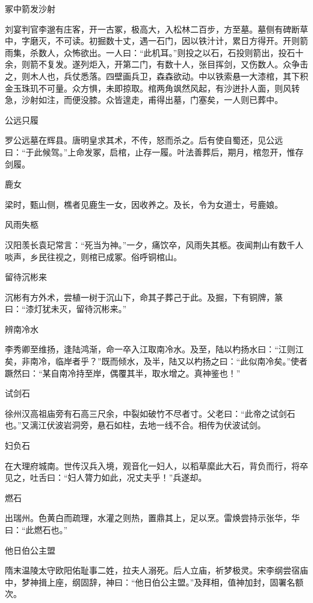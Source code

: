 \documentclass[a4paper,12pt,UTF8,twoside]{ctexbook}
\begin{document}
    冢中箭发沙射
    
    刘宴判官李邈有庄客，开一古冢，极高大，入松林二百步，方至墓。墓侧有碑断草中，字磨灭，不可读。初掘数十丈，遇一石门，因以铁汁计，累日方得开。开则箭雨集，杀数人，众怖欲出。一人曰：“此机耳。”则投之以石，石投则箭出，投石十余，则箭不复发。遂列炬入，开第二门，有数十人，张目挥剑，又伤数人。众争击之，则木人也，兵仗悉落。四壁画兵卫，森森欲动。中以铁索悬一大漆棺，其下积金玉珠玑不可量。众方惧，未即掠取。棺两角飒然风起，有沙迸扑人面，则风转急，沙射如注，而便没膝。众皆遑走，甫得出墓，门塞矣，一人则已葬中。
    
    公远只履
    
    罗公远墓在辉县。唐明皇求其术，不传，怒而杀之。后有使自蜀还，见公远曰：“于此候驾。”上命发冢，启棺，止存一履。叶法善葬后，期月，棺忽开，惟存剑履。
    
    鹿女
    
    梁时，甄山侧，樵者见鹿生一女，因收养之。及长，令为女道士，号鹿娘。
    
    风雨失柩
    
    汉阳羡长袁玘常言：“死当为神。”一夕，痛饮卒，风雨失其柩。夜闻荆山有数千人啖声，乡民往视之，则棺已成冢。俗呼铜棺山。
    
    留待沉彬来
    
    沉彬有方外术，尝植一树于沉山下，命其子葬己于此。及掘，下有铜牌，篆曰：“漆灯犹未灭，留待沉彬来。”
    
    辨南冷水
    
    李秀卿至维扬，逢陆鸿渐，命一卒入江取南冷水。及至，陆以杓扬水曰：“江则江矣，非南冷，临岸者乎？”既而倾水，及半，陆又以杓扬之曰：“此似南冷矣。”使者蹶然曰：“某自南冷持至岸，偶覆其半，取水增之。真神鉴也！”
    
    试剑石
    
    徐州汉高祖庙旁有石高三尺余，中裂如破竹不尽者寸。父老曰：“此帝之试剑石也。”又漓江伏波岩洞旁，悬石如柱，去地一线不合。相传为伏波试剑。
    
    妇负石
    
    在大理府城南。世传汉兵入境，观音化一妇人，以稻草縻此大石，背负而行，将卒见之，吐舌曰：“妇人膂力如此，况丈夫乎！”兵遂却。
    
    燃石
    
    出瑞州。色黄白而疏理，水灌之则热，置鼎其上，足以烹。雷焕尝持示张华，华曰：“此燃石也。”
    
    他日伯公主盟
    
    隋末温陵太守欧阳佑耻事二姓，拉夫人溺死。后人立庙，祈梦极灵。宋李纲尝宿庙中，梦神揖上座，纲固辞，神曰：“他日伯公主盟。”及拜相，值神加封，固署名额次。
    
\end{document}
